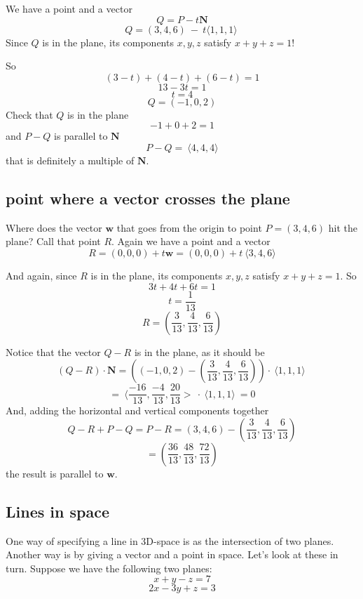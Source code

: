 \documentclass[11pt, oneside]{article}
\begin{document}
We have a point and a vector
\[ Q = P - t \mathbf{N} \]
\[ Q = (3,4,6) \ - \ t \langle 1,1,1 \rangle \ \]
Since $Q$ is in the plane, its components $x,y,z$ satisfy $x + y + z = 1$!  

So
\[ (3-t) + (4-t) + (6-t) = 1 \]
\[ 13 -3t = 1\]
\[ t = 4 \]
\[ Q = (-1,0,2) \]
Check that $Q$ is in the plane
\[ -1 + 0 + 2 = 1 \]
and $P-Q$ is parallel to $\mathbf{N}$
\[ P - Q = \ \langle 4,4,4 \rangle \]
that is definitely a multiple of $\mathbf{N}$.

\subsection*{point where a vector crosses the plane}

Where does the vector $\mathbf{w}$ that goes from the origin to point $P=(3,4,6)$ hit the plane?  Call that point $R$.  Again we have a point and a vector 
\[ R = (0,0,0) + t \mathbf{w} = (0,0,0) + t \ \langle 3,4,6 \rangle \]

And again, since $R$ is in the plane, its components $x,y,z$ satisfy $x + y + z = 1$.  So
\[ 3t + 4t + 6t = 1 \]
\[ t = \frac{1}{13} \]
\[ R = (\frac{3}{13}, \frac{4}{13}, \frac{6}{13}) \]

Notice that the vector $Q-R$ is in the plane, as it should be
\[ (Q-R) \cdot \mathbf{N} =  ((-1,0,2) - (\frac{3}{13}, \frac{4}{13}, \frac{6}{13})) \cdot \ \langle 1,1,1 \rangle \ \]
\[ =  \ \langle \frac{-16}{13}, \frac{-4}{13}, \frac{20}{13}> \  \cdot  \ \langle 1,1,1 \rangle  \ = 0 \]
And, adding the horizontal and vertical components together
\[ Q - R + P - Q = P - R = (3,4,6) - (\frac{3}{13}, \frac{4}{13}, \frac{6}{13}) \]
\[ = (\frac{36}{13}, \frac{48}{13}, \frac{72}{13}) \]
the result is parallel to $\mathbf{w}$.

\subsection*{Lines in space}

One way of specifying a line in 3D-space is as the intersection of two planes.  Another way is by giving a vector and a point in space.  Let's look at these in turn.
\noindent
Suppose we have the following two planes:
\[ x + y - z = 7 \]
\[2x - 3y + z = 3 \]
\end{document}
